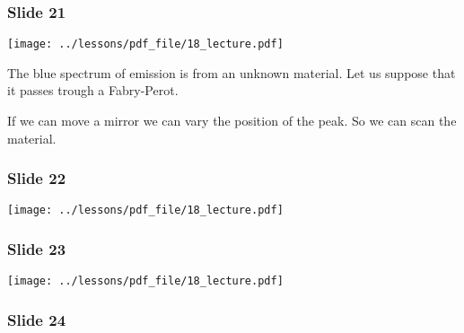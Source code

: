 \documentclass[../main/main.tex]{subfiles}
\begin{document}
\subsubsection*{Slide 21}

\begin{minipage}[]{0.5\linewidth}
\centering
\texttt{[image: ../lessons/pdf\_file/18\_lecture.pdf]}
\end{minipage}
\hspace{0.3cm}\vspace{0.3cm}
\begin{minipage}[c]{0.47\linewidth}

The blue spectrum of emission is from an unknown material. Let us suppose that it passes trough a Fabry-Perot.

If we can move a mirror we can vary the position of the peak. So we can scan the material.

\end{minipage}

\subsubsection*{Slide 22}

\begin{minipage}[]{0.5\linewidth}
\centering
\texttt{[image: ../lessons/pdf\_file/18\_lecture.pdf]}
\end{minipage}
\hspace{0.3cm}\vspace{0.3cm}
\begin{minipage}[c]{0.47\linewidth}

\end{minipage}

\subsubsection*{Slide 23}

\begin{minipage}[]{0.5\linewidth}
\centering
\texttt{[image: ../lessons/pdf\_file/18\_lecture.pdf]}
\end{minipage}
\hspace{0.3cm}\vspace{0.3cm}
\begin{minipage}[c]{0.47\linewidth}

\end{minipage}

\subsubsection*{Slide 24}
\end{document}
